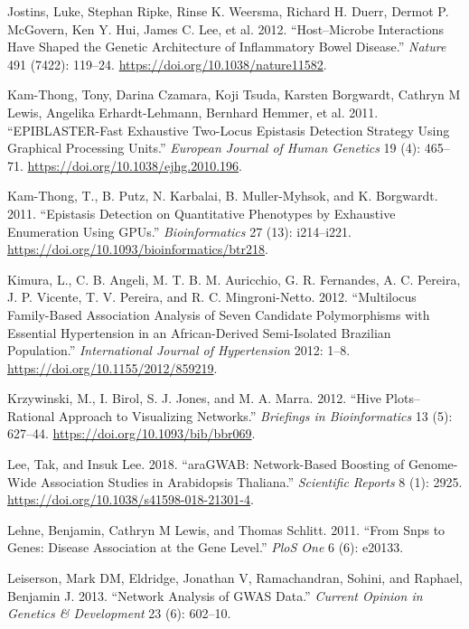 \documentclass[
  11pt,
]{env/yjiao}
\newlength{\cslhangindent}
\newenvironment{cslreferences}%
  {\setlength{\parindent}{0pt}%
  \everypar{\setlength{\hangindent}{\cslhangindent}}\ignorespaces}%
  {\par}
\begin{document}
\begin{cslreferences}
\leavevmode\hypertarget{ref-jostins_hostmicrobe_2012}{}%
Jostins, Luke, Stephan Ripke, Rinse K. Weersma, Richard H. Duerr, Dermot P. McGovern, Ken Y. Hui, James C. Lee, et al. 2012. ``Host--Microbe Interactions Have Shaped the Genetic Architecture of Inflammatory Bowel Disease.'' \emph{Nature} 491 (7422): 119--24. \url{https://doi.org/10.1038/nature11582}.

\leavevmode\hypertarget{ref-kam-thong_epiblaster-fast_2011}{}%
Kam-Thong, Tony, Darina Czamara, Koji Tsuda, Karsten Borgwardt, Cathryn M Lewis, Angelika Erhardt-Lehmann, Bernhard Hemmer, et al. 2011. ``EPIBLASTER-Fast Exhaustive Two-Locus Epistasis Detection Strategy Using Graphical Processing Units.'' \emph{European Journal of Human Genetics} 19 (4): 465--71. \url{https://doi.org/10.1038/ejhg.2010.196}.

\leavevmode\hypertarget{ref-kam-thong_epistasis_2011}{}%
Kam-Thong, T., B. Putz, N. Karbalai, B. Muller-Myhsok, and K. Borgwardt. 2011. ``Epistasis Detection on Quantitative Phenotypes by Exhaustive Enumeration Using GPUs.'' \emph{Bioinformatics} 27 (13): i214--i221. \url{https://doi.org/10.1093/bioinformatics/btr218}.

\leavevmode\hypertarget{ref-kimura_multilocus_2012}{}%
Kimura, L., C. B. Angeli, M. T. B. M. Auricchio, G. R. Fernandes, A. C. Pereira, J. P. Vicente, T. V. Pereira, and R. C. Mingroni-Netto. 2012. ``Multilocus Family-Based Association Analysis of Seven Candidate Polymorphisms with Essential Hypertension in an African-Derived Semi-Isolated Brazilian Population.'' \emph{International Journal of Hypertension} 2012: 1--8. \url{https://doi.org/10.1155/2012/859219}.

\leavevmode\hypertarget{ref-krzywinski_hive_2012}{}%
Krzywinski, M., I. Birol, S. J. Jones, and M. A. Marra. 2012. ``Hive Plots--Rational Approach to Visualizing Networks.'' \emph{Briefings in Bioinformatics} 13 (5): 627--44. \url{https://doi.org/10.1093/bib/bbr069}.

\leavevmode\hypertarget{ref-lee_aragwab_2018}{}%
Lee, Tak, and Insuk Lee. 2018. ``araGWAB: Network-Based Boosting of Genome-Wide Association Studies in Arabidopsis Thaliana.'' \emph{Scientific Reports} 8 (1): 2925. \url{https://doi.org/10.1038/s41598-018-21301-4}.

\leavevmode\hypertarget{ref-lehne2011snps}{}%
Lehne, Benjamin, Cathryn M Lewis, and Thomas Schlitt. 2011. ``From Snps to Genes: Disease Association at the Gene Level.'' \emph{PloS One} 6 (6): e20133.

\leavevmode\hypertarget{ref-leiserson_network_2013}{}%
Leiserson, Mark DM, Eldridge, Jonathan V, Ramachandran, Sohini, and Raphael, Benjamin J. 2013. ``Network Analysis of GWAS Data.'' \emph{Current Opinion in Genetics \& Development} 23 (6): 602--10.


\end{cslreferences}
\end{document}
